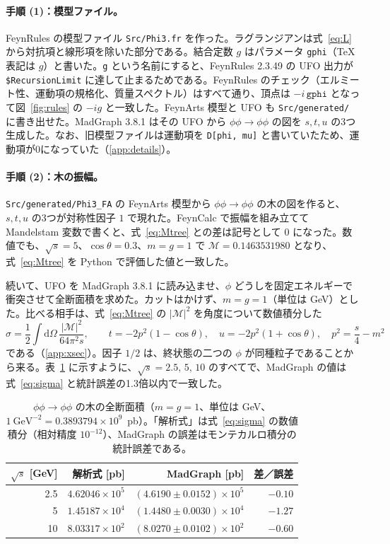 \documentclass[a4paper,10pt]{ltjsarticle}
\newcommand{\dd}{\mathrm{d}}
\begin{document}
\paragraph{手順 (1)：模型ファイル。}FeynRules の模型ファイル \texttt{Src/Phi3.fr} を作った。ラグランジアンは式~\eqref{eq:L} から対抗項と線形項を除いた部分である。結合定数 $g$ はパラメータ \texttt{gphi}（TeX 表記は $g$）と書いた。\texttt{g} という名前にすると、FeynRules 2.3.49 の UFO 出力が \texttt{\$RecursionLimit} に達して止まるためである。FeynRules のチェック（エルミート性、運動項の規格化、質量スペクトル）はすべて通り、頂点は $-i\,\texttt{gphi}$ となって図~\ref{fig:rules} の $-ig$ と一致した。FeynArts 模型と UFO も \texttt{Src/generated/} に書き出せた。MadGraph 3.8.1 はその UFO から $\phi\phi\to\phi\phi$ の図を $s,t,u$ の3つ生成した。なお、旧模型ファイルは運動項を \texttt{D[phi, mu]} と書いていたため、運動項が0になっていた（\ref{app:details}）。

\paragraph{手順 (2)：木の振幅。}\texttt{Src/generated/Phi3\_FA} の FeynArts 模型から $\phi\phi\to\phi\phi$ の木の図を作ると、$s,t,u$ の3つが対称性因子 $1$ で現れた。FeynCalc で振幅を組み立てて Mandelstam 変数で書くと、式~\eqref{eq:Mtree} との差は記号として $0$ になった。数値でも、$\sqrt{s}=5$、$\cos\theta=0.3$、$m=g=1$ で $\mathcal{M}=0.1463531980$ となり、式~\eqref{eq:Mtree} を Python で評価した値と一致した。

続いて、UFO を MadGraph 3.8.1 に読み込ませ、$\phi$ どうしを固定エネルギーで衝突させて全断面積を求めた。カットはかけず、$m=g=1$（単位は GeV）とした。比べる相手は、式~\eqref{eq:Mtree} の $|\mathcal{M}|^2$ を角度について数値積分した
\begin{equation}
\sigma=\frac12\int\!\dd\Omega\,\frac{|\mathcal{M}|^2}{64\pi^2s},\qquad
t=-2p^2(1-\cos\theta),\quad u=-2p^2(1+\cos\theta),\quad p^2=\frac{s}{4}-m^2
\label{eq:sigma}
\end{equation}
である（\ref{app:xsec}）。因子 $1/2$ は、終状態の二つの $\phi$ が同種粒子であることから来る。表~\ref{tab:tree} に示すように、$\sqrt{s}=2.5,\,5,\,10$ のすべてで、MadGraph の値は式~\eqref{eq:sigma} と統計誤差の1.3倍以内で一致した。

\begin{table}[tbp]
\centering\small
\caption{$\phi\phi\to\phi\phi$ の木の全断面積（$m=g=1$、単位は GeV、$1~\mathrm{GeV}^{-2}=0.3893794\times10^{9}$~pb）。「解析式」は式~\eqref{eq:sigma} の数値積分（相対精度 $10^{-12}$）、MadGraph の誤差はモンテカルロ積分の統計誤差である。}
\label{tab:tree}
\begin{tabular}{rrrr}
\toprule
$\sqrt{s}$ [GeV] & 解析式 [pb] & MadGraph [pb] & 差／誤差 \\
\midrule
2.5 & $4.62046\times10^{5}$ & $(4.6190\pm0.0152)\times10^{5}$ & $-0.10$ \\
5 & $1.45187\times10^{4}$ & $(1.4480\pm0.0030)\times10^{4}$ & $-1.27$ \\
10 & $8.03317\times10^{2}$ & $(8.0270\pm0.0102)\times10^{2}$ & $-0.60$ \\
\bottomrule
\end{tabular}
\end{table}
\end{document}
